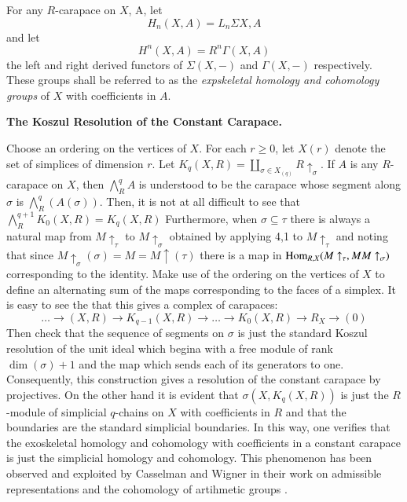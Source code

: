 \begin{definition}\label{art6-definition-1.9}
For any $R$-carapace on $X$, A, let
$$
H_{n}(X, A)= L_{n}\Sigma{X, A}
$$
and let
$$
H^{n}(X, A) = R^{n}\Gamma(X, A)
$$
the left and right derived functors of $\Sigma(X, -)$ and $\Gamma(X, -)$ respectively. These groups shall be referred to as the \textit{expskeletal homology and cohomology groups} of $X$ with coefficients in $A$.
\end{definition}

\begin{example}
\textbf{The Koszul Resolution of the Constant Carapace.}

Choose an ordering on the vertices of $X$. For each $r \geq 0$, let $X(r)$ denote the set of simplices of dimension $r$. Let $K_{q}(X, R) = \coprod _{\sigma \in X_{(q)}} R \uparrow_{\sigma}$. If $A$ is any $R$-carapace on $X$, then $\bigwedge_{R}^{q}A$ is understood to be the carapace whose segment along $\sigma$ is $\bigwedge_{R}^{q}(A(\sigma))$. Then, it is not at all difficult to see that $\bigwedge_{R}^{q+1}K_{0}(X, R) = K_{q}(X, R)$ Furthermore, when
$\sigma \subseteq \tau$ there is always a natural map from $M\uparrow_{\tau}$ to $M \uparrow_{\sigma}$ obtained by applying 4,1 to $M\uparrow_{\tau}$ and noting that since $M\uparrow_{\sigma}(\sigma) = M = M\uparrow(\tau)$ there is a map in $\operatorname{Hom}_{R, X}(M\uparrow_{\tau}, MM\uparrow_{\sigma})$ corresponding to the identity. Make use of the ordering on the vertices of $X$ to define an alternating sum of the maps corresponding to the faces of a simplex. It is easy to see the that this gives a complex of carapaces:
$$
\ldots \rightarrow (X, R)\rightarrow K_{q-1}(X, R)\rightarrow\ldots \rightarrow K_{0}(X, R)\rightarrow R_{X}\rightarrow(0)
$$ 
Then check that the sequence of segments on $\sigma$ is just the standard Koszul resolution of the unit ideal which begina with a free module of rank $\dim(\sigma) + 1$ and the map which sends each of its generators to one. Consequently, this construction gives a resolution of the constant carapace by projectives. On the other hand it is evident that $\sigma(X, K_{q}(X, R))$ is just the $R$-module of simplicial $q$-chains on $X$ with coefficients in $R$ and that the boundaries are the standard simplicial boundaries. In this way, one verifies that the exoskeletal homology and cohomology with coefficients in a constant carapace is just the simplicial homology and cohomology. This phenomenon has been observed and exploited by Casselman and Wigner in their work on admissible representations and the cohomology of artihmetic groups \cite{art6-keyCW}.
\end{example}

